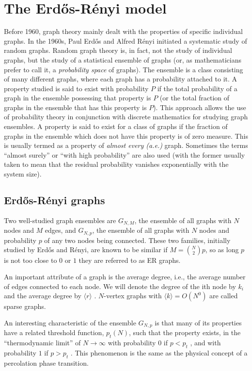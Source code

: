 \section{The Erdős-Rényi model}

\nd Before 1960, graph theory mainly dealt with the properties of specific individual graphs. In the 1960s, Paul Erdős and Alfred Rényi initiated a systematic study of random graphs. Random graph theory is, in fact, not the study of individual graphs, but the study of a statistical ensemble of graphs (or, as mathematicians prefer to call it, a \emph{probability space} of graphs). The ensemble is a class consisting of many different graphs, where each graph has a probability attached to it. A property studied is said to exist with probability $P$ if the total probability of a graph in the ensemble possessing that property is $P$ (or the total fraction of graphs in the ensemble that has this property is $P$). This approach allows the use of probability theory in conjunction with discrete mathematics for studying graph ensembles.  A property is said to exist for a class of graphs if the fraction of graphs in the ensemble which does not have this property is of zero measure. This is usually termed as a property of \emph{almost every (a.e.)} graph. Sometimes the terms “almost surely” or “with high probability” are also used (with the former usually taken to mean that the residual probability vanishes exponentially with the system size). \s


\subsection{Erdős-Rényi graphs}

\nd Two well-studied graph ensembles are $G_{N,M}$, the ensemble of all graphs with $N$ nodes and $M$ edges, and $G_{N,p}$, the ensemble of all graphs with $N$ nodes and probability $p$ of any two nodes being connected. These two families, initially studied by Erdős and Rényi, are known to be similar if $M = \binom{N}{2} p$, so as long $p$ is not too close to $0$ or $1$ they are referred to as ER graphs. \s

\nd An important attribute of a graph is the average degree, i.e., the average number of edges connected to each node. We will denote the degree of the ith node by $k_i$ and the average degree by $ \langle r \rangle $ . $N$-vertex graphs with $\langle k \rangle = O(N^0)$ are called sparse graphs. \s

\nd An interesting characteristic of the ensemble $G_{N,p}$ is that many of its properties have a related threshold function, $p_t(N)$, such that the property exists, in the “thermodynamic limit” of $N \to \infty$  with probability 0 if $p < p_t$ , and with probability $1$ if $p > p_t$ . This phenomenon is the same as the physical concept of a percolation phase transition. \s

